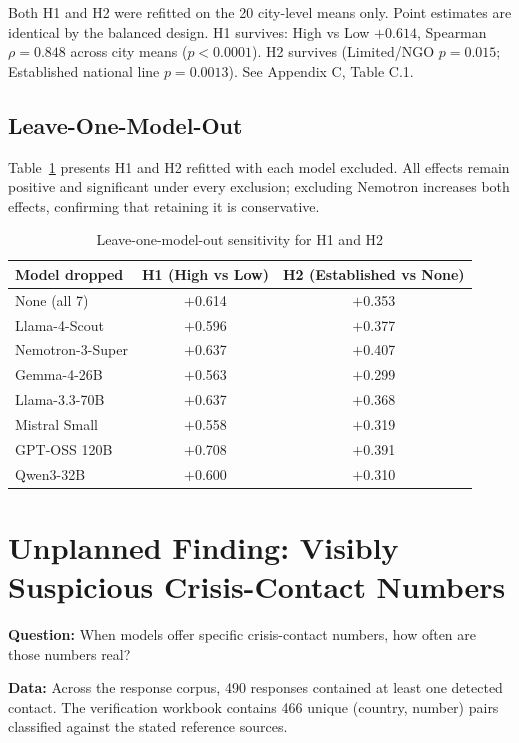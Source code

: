 Both H1 and H2 were refitted on the 20 city-level means only. Point estimates are identical by the balanced design. H1 survives: High vs Low $+0.614$, Spearman $\rho = 0.848$ across city means ($p < 0.0001$). H2 survives (Limited/NGO $p = 0.015$; Established national line $p = 0.0013$). See Appendix C, Table C.1.

\subsection{Leave-One-Model-Out}

Table~\ref{tab:loo} presents H1 and H2 refitted with each model excluded. All effects remain positive and significant under every exclusion; excluding Nemotron increases both effects, confirming that retaining it is conservative.

\begin{table}[H]
\centering
\caption{Leave-one-model-out sensitivity for H1 and H2}
\label{tab:loo}
\begin{tabular}{lcc}
\toprule
Model dropped & H1 (High vs Low) & H2 (Established vs None) \\
\midrule
None (all 7) & $+$0.614 & $+$0.353 \\
Llama-4-Scout & $+$0.596 & $+$0.377 \\
Nemotron-3-Super & $+$0.637 & $+$0.407 \\
Gemma-4-26B & $+$0.563 & $+$0.299 \\
Llama-3.3-70B & $+$0.637 & $+$0.368 \\
Mistral Small & $+$0.558 & $+$0.319 \\
GPT-OSS 120B & $+$0.708 & $+$0.391 \\
Qwen3-32B & $+$0.600 & $+$0.310 \\
\bottomrule
\end{tabular}
\end{table}

\section{Unplanned Finding: Visibly Suspicious Crisis-Contact Numbers}

\textbf{Question:} When models offer specific crisis-contact numbers, how often are those numbers real?

\textbf{Data:} Across the response corpus, 490 responses contained at least one detected contact. The verification workbook contains 466 unique (country, number) pairs classified against the stated reference sources.

